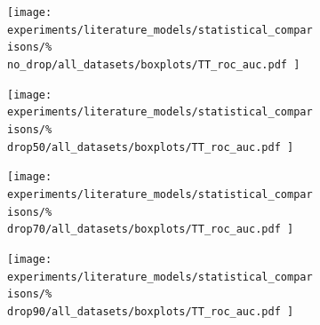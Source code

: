 \begin{figure}[tb]
    \begin{subfigure}{0.24\textwidth}
        \texttt{[image: 
            experiments/literature\_models/statistical\_comparisons/\%
            no\_drop/all\_datasets/boxplots/TT\_roc\_auc.pdf
        ]}
    \end{subfigure}
    \begin{subfigure}{0.24\textwidth}
        \texttt{[image: 
            experiments/literature\_models/statistical\_comparisons/\%
            drop50/all\_datasets/boxplots/TT\_roc\_auc.pdf
        ]}
    \end{subfigure}
    \begin{subfigure}{0.24\textwidth}
        \texttt{[image: 
            experiments/literature\_models/statistical\_comparisons/\%
            drop70/all\_datasets/boxplots/TT\_roc\_auc.pdf
        ]}
    \end{subfigure}
    \begin{subfigure}{0.24\textwidth}
        \texttt{[image: 
            experiments/literature\_models/statistical\_comparisons/\%
            drop90/all\_datasets/boxplots/TT\_roc\_auc.pdf
        ]}
    \end{subfigure}


\end{figure}
